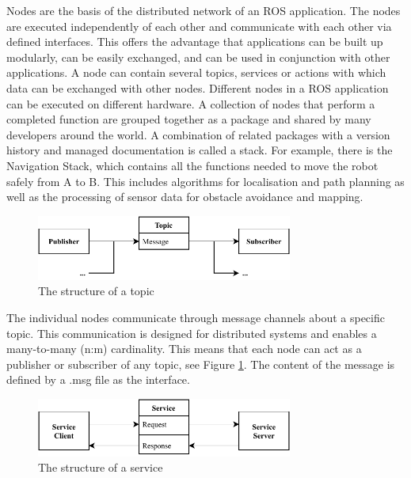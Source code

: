 Nodes are the basis of the distributed network of an ROS application. The nodes are executed independently of each other and communicate with each other via defined interfaces. This offers the advantage that applications can be built up modularly, can be easily exchanged, and can be used in conjunction with other applications. A node can contain several topics, services or actions with which data can be exchanged with other nodes. Different nodes in a ROS application can be executed on different hardware. A collection of nodes that perform a completed function are grouped together as a package and shared by many developers around the world. A combination of related packages with a version history and managed documentation is called a stack. For example, there is the Navigation Stack, which contains all the functions needed to move the robot safely from A to B. This includes algorithms for localisation and path planning as well as the processing of sensor data for obstacle avoidance and mapping.

\begin{figure}[h]
    \centering
    \includegraphics[width=0.75\textwidth]{figures/02_state_of_the_art/topics.pdf}
    \caption{The structure of a topic}
    \label{fig:topics}
\end{figure}

The individual nodes communicate through message channels about a specific topic. This communication is designed for distributed systems and enables a many-to-many (n:m) cardinality. This means that each node can act as a publisher or subscriber of any topic, see Figure \ref{fig:topics}. The content of the message is defined by a .msg file as the interface.

\begin{figure}[h]
    \centering
    \includegraphics[width=0.75\textwidth]{figures/02_state_of_the_art/services.pdf}
    \caption{The structure of a service}
    \label{fig:services}
\end{figure}

